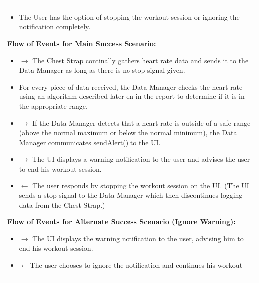 \documentclass[letterpaper,english, 12pt]{scrreprt}
\begin{document}
\begin{center}
\begin{longtable}{|C{15cm}|}
\begin{itemize}
                                        \item The User has the option of stopping the workout session or ignoring the notification completely.
                                \end{itemize}
                        \begin{flushleft}
                                \textbf{Flow of Events for Main Success Scenario: }
                        \end{flushleft}
                                \begin{itemize}
                                        \item $\rightarrow$ The Chest Strap continally gathers heart rate data and sends it to the Data Manager as long as there is no stop signal given.
                                        \item For every piece of data received, the Data Manager checks the heart rate using an algorithm described later on in the report to determine if it is in the appropriate range.
                                        \item $\rightarrow$ If the Data Manager detects that a heart rate is outside of a safe range (above the normal maximum or below the normal minimum), the Data Manager communicates sendAlert() to the UI.
                                        \item $\rightarrow$ The UI displays a warning notification to the user and advises the user to end his workout session.
										\item $\leftarrow$ The user responds by stopping the workout session on the UI. (The UI sends a stop signal to the Data Manager which then discontinues logging data from the Chest Strap.)
                               \end{itemize}
                        \begin{flushleft}
                                \textbf{Flow of Events for Alternate Success Scenario (Ignore Warning): }
                        \end{flushleft}
                                \begin{itemize}
                                        \item $\rightarrow$ The UI displays the warning notification to the user, advising him to end his workout session.
                                        \item $\leftarrow$The user chooses to ignore the notification and continues his workout

\end{itemize}
\end{longtable}
\end{center}
\end{document}
